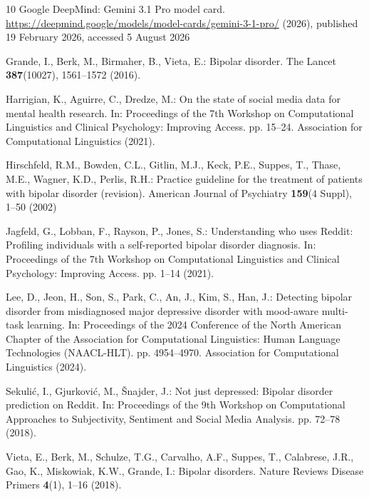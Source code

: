 \documentclass[runningheads]{llncs}
\begin{document}
\begin{thebibliography}{10}
{Google DeepMind}: Gemini 3.1 {Pro} model card.
  \url{https://deepmind.google/models/model-cards/gemini-3-1-pro/} (2026),
  published 19 February 2026, accessed 5 August 2026

Grande, I., Berk, M., Birmaher, B., Vieta, E.: Bipolar disorder. The Lancet
  \textbf{387}(10027),  1561--1572 (2016). 

Harrigian, K., Aguirre, C., Dredze, M.: On the state of social media data for
  mental health research. In: Proceedings of the 7th Workshop on Computational
  Linguistics and Clinical Psychology: Improving Access. pp. 15--24.
  Association for Computational Linguistics (2021).

Hirschfeld, R.M., Bowden, C.L., Gitlin, M.J., Keck, P.E., Suppes, T., Thase,
  M.E., Wagner, K.D., Perlis, R.H.: Practice guideline for the treatment of
  patients with bipolar disorder (revision). American Journal of Psychiatry
  \textbf{159}(4 Suppl),  1--50 (2002)

Jagfeld, G., Lobban, F., Rayson, P., Jones, S.: Understanding who uses
  {Reddit}: Profiling individuals with a self-reported bipolar disorder
  diagnosis. In: Proceedings of the 7th Workshop on Computational Linguistics
  and Clinical Psychology: Improving Access. pp. 1--14 (2021).

Lee, D., Jeon, H., Son, S., Park, C., An, J., Kim, S., Han, J.: Detecting
  bipolar disorder from misdiagnosed major depressive disorder with mood-aware
  multi-task learning. In: Proceedings of the 2024 Conference of the North
  American Chapter of the Association for Computational Linguistics: Human
  Language Technologies (NAACL-HLT). pp. 4954--4970. Association for
  Computational Linguistics (2024). 

Sekuli{\'c}, I., Gjurkovi{\'c}, M., {\v{S}}najder, J.: Not just depressed:
  Bipolar disorder prediction on {Reddit}. In: Proceedings of the 9th Workshop
  on Computational Approaches to Subjectivity, Sentiment and Social Media
  Analysis. pp. 72--78 (2018). 

Vieta, E., Berk, M., Schulze, T.G., Carvalho, A.F., Suppes, T., Calabrese,
  J.R., Gao, K., Miskowiak, K.W., Grande, I.: Bipolar disorders. Nature Reviews
  Disease Primers  \textbf{4}(1),  1--16 (2018). 


\end{thebibliography}
\end{document}
